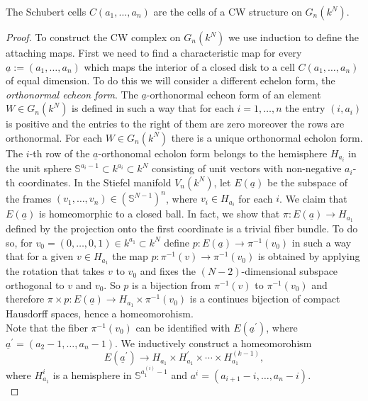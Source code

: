 \documentclass[a4paper,openany]{scrbook}
\begin{document}
\begin{prop}\label{prop:GrassmannianCWstructure}
The Schubert cells $C(a_1,\dots ,a_n)$ are the cells of a CW structure on $G_n(k^N)$.
\end{prop}
\begin{proof}
To construct the CW complex on $G_n(k^N)$ we use induction to define the attaching maps. First we need to find a characteristic map for every $\underline{a}:=(a_1,\dots ,a_n)$ which maps the interior of a closed disk to a cell $C(a_1,\dots ,a_n)$ of equal dimension. To do this we will consider a different echelon form, the \textit{orthonormal echeon form}. The $\underline{a}$-orthonormal echeon form of an element $W\in G_n(k^N)$ is defined in such a way that for each $i=1,\dots , n$ the entry $(i,a_i)$ is positive and the entries to the right of them are zero moreover the rows are orthonormal. For each $W\in G_n(k^N)$ there is a unique orthonormal echolon form.\\ 
The $i$-th row of the $\underline{a}$-orthonomal echolon form belongs to the hemisphere $H_{a_i}$ in the unit sphere $\mathbb{S}^{a_i-1}\subset k^{a_i}\subset k^N$ consisting of unit vectors with non-negative $a_i$-th coordinates. In the Stiefel manifold $V_n(k^N)$, let $E(\underline{a})$ be the subspace of the frames $(v_1,\dots ,v_n)\in (\mathbb{S}^{N-1})^n$, where $v_i\in H_{a_i}$ for each $i$. We claim that $E(\underline{a})$ is homeomorphic to a closed ball. In fact, we show that  $\pi :E(\underline{a})\longrightarrow H_{a_1}$ defined by the projection onto the first coordinate is a trivial fiber bundle. To do so, for $v_0=(0,\dots ,0,1)\in  k^{a_1}\subset k^N$ define $p:E(\underline{a})\longrightarrow \pi^{-1}(v_0)$ in such a way that for a given $v\in H_{a_1}$ the map $p:\pi^{-1}(v)\longrightarrow \pi^{-1}(v_0)$ is obtained by applying the rotation that takes $v$ to $v_0$ and fixes the $(N-2)$-dimensional subspace orthogonal to $v$ and $v_0$. So $p$ is a bijection from $\pi^{-1}(v)$ to $\pi^{-1}(v_0)$ and therefore $\pi\times p :E(\underline{a})\longrightarrow H_{a_1}\times \pi^{-1}(v_0)$ is a continues bijection of compact Hausdorff spaces, hence a homeomorohism. \\
Note that the fiber $\pi^{-1}(v_0)$ can be identified with $E(\underline{a}^\prime)$, where $\underline{a}^\prime=(a_2-1,\dots ,a_n-1)$. We inductively construct a homeomorohism
$$
E(\underline{a}^\prime)\longrightarrow H_{a_1}\times H^\prime_{a_1}\times \cdots \times H^{(k-1)}_{a_1},
$$
where $H^{i}_{a_1}$ is a hemisphere in $\mathbb{S}^{{a}^{(i)}_1-1}$ and $a^{i}=(a_{i+1}-i,\dots ,a_n-i)$.\\

\end{proof}
\end{document}
